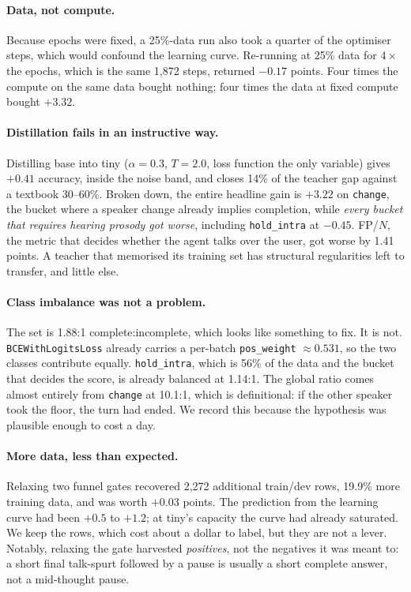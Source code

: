 \documentclass[11pt]{article}
\newcommand{\pct}{\%}
\begin{document}
\paragraph{Data, not compute.} Because epochs were fixed, a 25\pct{}-data run
also took a quarter of the optimiser steps, which would confound the learning
curve. Re-running at 25\pct{} data for $4\times$ the epochs, which is the same
1,872 steps, returned $-0.17$ points. Four times the compute on the same data
bought nothing; four times the data at fixed compute bought $+3.32$.

\paragraph{Distillation fails in an instructive way.} Distilling base into tiny
($\alpha=0.3$, $T=2.0$, loss function the only variable) gives $+0.41$ accuracy,
inside the noise band, and closes 14\pct{} of the teacher gap against a
textbook 30--60\pct{}. Broken down, the entire headline gain is $+3.22$ on
\texttt{change}, the bucket where a speaker change already implies completion,
while \emph{every bucket that requires hearing prosody got worse}, including
\texttt{hold\_intra} at $-0.45$. FP/$N$, the metric that decides whether the
agent talks over the user, got worse by 1.41 points. A teacher that
memorised its training set has structural regularities left to transfer, and
little else.

\paragraph{Class imbalance was not a problem.} The set is 1.88:1
complete:incomplete, which looks like something to fix. It is not.
\texttt{BCEWithLogitsLoss} already carries a per-batch \texttt{pos\_weight}
$\approx 0.531$, so the two classes contribute equally. \texttt{hold\_intra},
which is 56\pct{} of the data and the bucket that decides the score, is already
balanced at 1.14:1. The global ratio comes almost entirely from \texttt{change}
at 10.1:1, which is definitional: if the other speaker took the floor, the turn
had ended. We record this because the hypothesis was plausible enough to cost a
day.

\paragraph{More data, less than expected.} Relaxing two funnel gates recovered
2,272 additional train/dev rows, 19.9\pct{} more training data, and was worth
$+0.03$ points. The prediction from the learning curve had been $+0.5$ to
$+1.2$; at tiny's capacity the curve had already saturated. We keep the rows,
which cost about a dollar to label, but they are not a lever.
Notably, relaxing the gate harvested \emph{positives}, not the negatives it was
meant to: a short final talk-spurt followed by a pause is usually a short
complete answer, not a mid-thought pause.
\end{document}
